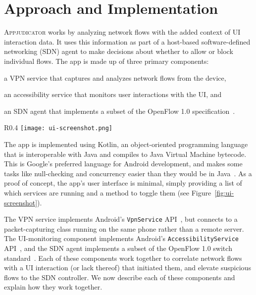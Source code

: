 \section{Approach and Implementation}
\label{sec:implementation}

\textsc{Appjudicator} works by analyzing network flows with the added context of
UI interaction data. It uses this information as part of a host-based
software-defined networking (SDN) agent to make decisions about whether to allow
or block individual flows. The app is made up of three primary components:
\begin{enumerate*}[label=(\arabic*)]
	\item a VPN service that captures and analyzes network flows from the
		device,
	\item an accessibility service that monitors user interactions with the
		UI, and
	\item an SDN agent that implements a subset of the OpenFlow 1.0
		specification~\cite{openflowspec}.
\end{enumerate*}

\begin{wrapfigure}{R}{0.4\textwidth}
	\centering
	\texttt{[image: ui-screenshot.png]}
	\caption{A screenshot of \textsc{Appjudicator}'s user interface.}
	\label{fig:ui-screenshot}
\end{wrapfigure}


The app is implemented using Kotlin, an object-oriented programming language
that is interoperable with Java and compiles to Java Virtual Machine bytecode.
This is Google's preferred language for Android development, and makes some
tasks like null-checking and concurrency easier than they would be in
Java~\cite{lardinois2019}. As a proof of concept, the app's user interface is
minimal, simply providing a list of which services are running and a method to
toggle them (see Figure~\ref{fig:ui-screenshot}).

The VPN service implements Android's \texttt{VpnService}
API~\cite{googledevelopers2020vpn}, but connects to a packet-capturing class
running on the same phone rather than a remote server. The UI-monitoring
component implements Android's \texttt{AccessibilityService}
API~\cite{googledevelopers2020}, and the SDN agent implements a subset of the
OpenFlow 1.0 switch standard~\cite{mckeown2008}. Each of these components work
together to correlate network flows with a UI interaction (or lack thereof) that
initiated them, and elevate suspicious flows to the SDN controller. We now
describe each of these components and explain how they work together.

